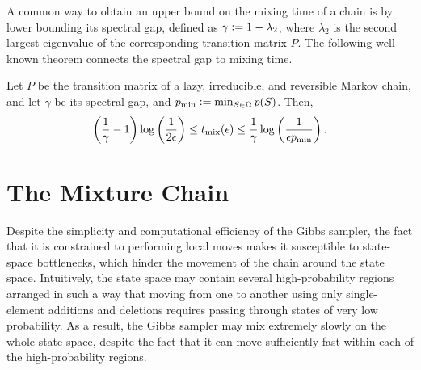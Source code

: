 A common way to obtain an upper bound on the mixing time of a chain is by lower bounding its spectral gap, defined as $\gamma \vcentcolon= 1 - \lambda_2$, where $\lambda_2$ is the second largest eigenvalue of the corresponding transition matrix $P$.
The following well-known theorem connects the spectral gap to mixing time.
\begin{theorem} \label{thm:spectral}
  Let $P$ be the transition matrix of a lazy, irreducible, and reversible Markov chain, and let $\gamma$ be its spectral gap, and $p_{\textrm{min}} \vcentcolon= \min_{S \in \Omega} p(S)$. Then,
  \begin{align*}
    \left( \frac{1}{\gamma} - 1 \right)\log\left( \frac{1}{2\epsilon} \right) \leq t_{\mathrm{mix}}(\epsilon) \leq \frac{1}{\gamma} \log\left( \frac{1}{\epsilon p_{\textrm{min}}} \right).
  \end{align*}
\end{theorem}

\section{The Mixture Chain}
Despite the simplicity and computational efficiency of the Gibbs sampler, the fact that it is constrained to performing local moves makes it susceptible to state-space bottlenecks, which hinder the movement of the chain around the state space.
Intuitively, the state space may contain several high-probability regions arranged in such a way that moving from one to another using only single-element additions and deletions requires passing through states of very low probability.
As a result, the Gibbs sampler may mix extremely slowly on the whole state space, despite the fact that it can move sufficiently fast within each of the high-probability regions.

